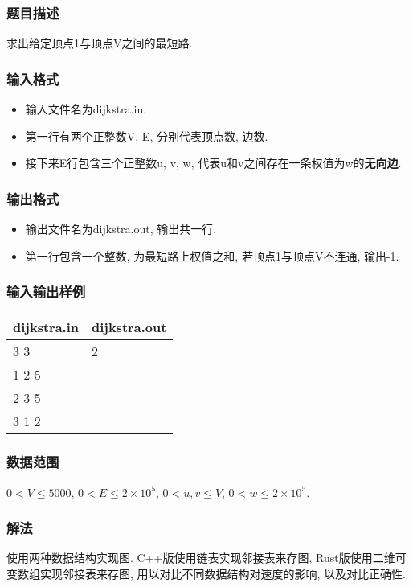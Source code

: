 \subsubsection{题目描述}
求出给定顶点1与顶点V之间的最短路.
\subsubsection{输入格式}
\begin{itemize}
	\item 输入文件名为dijkstra.in.
	\item 第一行有两个正整数V, E, 分别代表顶点数, 边数.
	\item 接下来E行包含三个正整数u, v, w, 代表u和v之间存在一条权值为w的\textbf{无向边}.
\end{itemize}

\subsubsection{输出格式}
\begin{itemize}
	\item 输出文件名为dijkstra.out, 输出共一行.
	\item 第一行包含一个整数, 为最短路上权值之和, 若顶点1与顶点V不连通, 输出-1.
\end{itemize}

\subsubsection{输入输出样例}
\label{sec:iosample}
\begin{table}[h!]
	\centering
	\begin{tabular}{|l|l|}
		\hline
		dijkstra.in & dijkstra.out \\
		\hline
		3 3         & 2            \\
		1 2 5       & ~            \\
		2 3 5       & ~            \\
		3 1 2       & ~            \\
		\hline
	\end{tabular}
\end{table}

\subsubsection{数据范围}
$0 < V \leq 5000$,
$0 < E \leq 2\times 10^5$,
$0 < u,v \leq V$,
$0 < w \leq 2\times 10^5$.

\subsubsection{解法}
使用两种数据结构实现图. C++版使用链表实现邻接表来存图,
Rust版使用二维可变数组实现邻接表来存图, 用以对比不同数据结构对速度的影响,
以及对比正确性.

